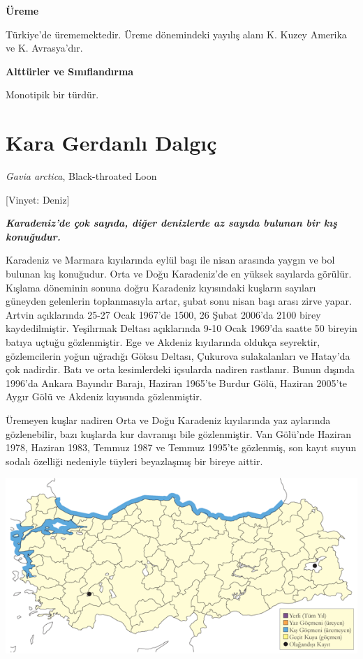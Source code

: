 \documentclass[
  letterpaper,
  DIV=11,
  numbers=noendperiod]{scrreprt}
\begin{document}
\textbf{Üreme}

Türkiye'de ürememektedir. Üreme dönemindeki yayılış alanı K. Kuzey
Amerika ve K. Avrasya'dır.

\textbf{Alttürler ve Sınıflandırma}

Monotipik bir türdür.

\section{Kara Gerdanlı Dalgıç}\label{kara-gerdanlux131-dalgux131uxe7}

\emph{Gavia arctica}, Black-throated Loon

{[}Vinyet: Deniz{]}

\textbf{\emph{Karadeniz'de çok sayıda, diğer denizlerde az sayıda
bulunan bir kış konuğudur.}}

Karadeniz ve Marmara kıyılarında eylül başı ile nisan arasında yaygın ve
bol bulunan kış konuğudur. Orta ve Doğu Karadeniz'de en yüksek sayılarda
görülür. Kışlama döneminin sonuna doğru Karadeniz kıyısındaki kuşların
sayıları güneyden gelenlerin toplanmasıyla artar, şubat sonu nisan başı
arası zirve yapar. Artvin açıklarında 25-27 Ocak 1967'de 1500, 26 Şubat
2006'da 2100 birey kaydedilmiştir. Yeşilırmak Deltası açıklarında 9-10
Ocak 1969'da saatte 50 bireyin batıya uçtuğu gözlenmiştir. Ege ve
Akdeniz kıyılarında oldukça seyrektir, gözlemcilerin yoğun uğradığı
Göksu Deltası, Çukurova sulakalanları ve Hatay'da çok nadirdir. Batı ve
orta kesimlerdeki içsularda nadiren rastlanır. Bunun dışında 1996'da
Ankara Bayındır Barajı, Haziran 1965'te Burdur Gölü, Haziran 2005'te
Aygır Gölü ve Akdeniz kıyısında gözlenmiştir.

Üremeyen kuşlar nadiren Orta ve Doğu Karadeniz kıyılarında yaz aylarında
gözlenebilir, bazı kuşlarda kur davranışı bile gözlenmiştir. Van
Gölü'nde Haziran 1978, Haziran 1983, Temmuz 1987 ve Temmuz 1995'te
gözlenmiş, son kayıt suyun sodalı özelliği nedeniyle tüyleri beyazlaşmış
bir bireye aittir.

\includegraphics{images/harita_Page_046.png}
\end{document}
